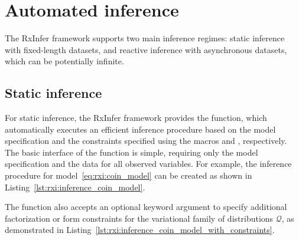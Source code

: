 \section{Automated inference}\label{chapter-04:section:automated-inference}

The RxInfer framework supports two main inference regimes: static inference with fixed-length
datasets, and reactive inference with asynchronous datasets, which can be potentially
infinite.

\subsection{Static inference}

For static inference, the RxInfer framework provides the  function, which
automatically executes an efficient inference procedure based on the model specification and the
constraints specified using the macros  and , respectively.
The basic interface of the  function is simple, requiring only the model
specification and the data for all observed variables.
For example, the inference procedure for model~\eqref{eq:rxi:coin_model} can be created as
shown in Listing~\ref{lst:rxi:inference_coin_model}.
\begin{figure*}[h!]
  \begin{adjustbox}{minipage=\textwidth,margin=0pt \smallskipamount,center}
  \end{adjustbox}
\end{figure*}

The  function also accepts an optional keyword argument 
to specify additional factorization or form constraints for the variational family of
distributions $\mathcal{Q}$, as demonstrated in
Listing~\ref{lst:rxi:inference_coin_model_with_constraints}.
\begin{figure*}[h!]
  \begin{adjustbox}{minipage=\textwidth,margin=0pt \smallskipamount,center}
  \end{adjustbox}
\end{figure*}

